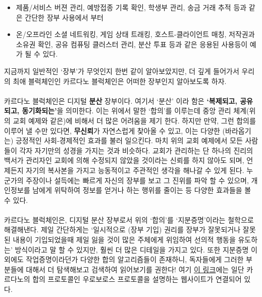 \documentclass[a4paper, 11pt]{article}
\begin{document}
\begin{description}
        \begin{itemize}
            \item 제품/서비스 버젼 관리, 예방접종 기록 확인, 학생부 관리, 송금 거래 추적 등과 같은 간단한 장부 사용에서 부터
            \item 온/오프라인 소셜 네트워킹, 게임 상태 트래킹, 호스트-클라이언트 매칭, 저작권과 소유권 확인, 공유 컴퓨팅 클러스터 관리, 분산 투표 등과 같은 응용된 사용등이 예가 될 수 있다.
        \end{itemize}

        지금까지 일반적인 `장부'가 무엇인지 한번 같이 알아보았지만, 더 깊게 들어가서 우리의 최애 블럭체인인 카르다노 블럭체인은 어떠한 장부인지 알아보도록 하자.

        \paragraph{}카르다노 블럭체인은 디지털 \textbf{분산} 장부이다. 여기서 `분산' 이라 함은 \textbf{`복제되고, 공유되고, 동기화되는'}을 의미한다. 이는 위에서 말한 `합의'를 이루는데 중앙 관리 체계(위의 교회 예제와 같은)에 비해서 더 많은 어려움을 제기 한다. 하지만 만약, 그런 합의를 이루어 낼 수만 있다면, \textbf{무신뢰}가 자연스럽게 찾아올 수 있고, 이는 다양한 (바라옵기는) 긍정적인 사회-경제적인 효과를 불러 일으킨다. 마치 위의 교회 예제에서 모든 사람들이 각자 자기만의 성경을 가지는 것과 비슷하다. 교회가 관리하는 단 하나의 진리의 백서가 관리자인 교회에 의해 수정되지 않았을 것이라는 신뢰를 하지 않아도 되며, 언제든지 자기의 복사본을 가지고 능동적이고 주관적인 생각을 해나갈 수 있게 된다. 누군가의 주장이나 설득에는 빠르게 자신의 장부를 보고 그 진위를 파악 할 수 있으며, 개인정보를 남에게 위탁하여 정보를 얻거나 하는 행위를 줄이는 등 다양한 효과들을 볼 수 있다.

        \paragraph{} 카르다노 블럭체인은, 디지털 분산 장부로서 위의 `합의'를 `지분증명'이라는 철학으로 해결해낸다. 제일 간단하게는 `일시적으로 (장부 기입) 권리를 장부가 잘못되거나 잘못된 내용이 기입되었을때 제일 잃을 것이 많은 주체에게 위임하여 선의적 행동을 유도하는' 방식이라고 말 할 수 있지만, 훨씬 더 많은 디테일을 가지고 있다. 또한 지분증명 이외에도 작업증명이라던가 다양한 합의 알고리즘들이 존재하니, 독자들에게 그러한 부분들에 대해서 더 탐색해보고 검색하여 읽어보기를 권한다! 여기 \href{https://cardano.org/ouroboros/}{이 링크}에는 일단 카르다노의 합의 프로토콜인 우로보로스 프로토콜을 설명하는 웹사이트가 연결되어 있다.


\end{description}
\end{document}
